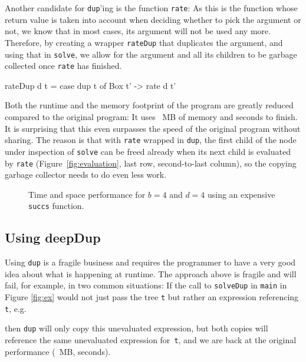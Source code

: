 \documentclass[preprint]{sigplanconf}
\theoremstyle{nonumberplain}
\newcommand{\li}{\lstinline[style=Haskell]}
\begin{document}
Another candidate for \li-dup-’ing is the function \li-rate-:
As this is the function whose return value is taken into account when deciding whether to pick the argument or not, we know that in most cases, its argument will not be used any more. Therefore, by creating a wrapper \li-rateDup- that duplicates the argument, and using that in \li-solve-, we allow for the argument and all its children to be garbage collected once \li-rate- has finished.
\begin{haskell}
rateDup d t = case dup t of Box t' -> rate d t'
\end{haskell}

Both the runtime and the memory footprint of the program are greatly reduced compared to the original program: It uses ~MB of memory and  seconds to finish. It is surprising that this even surpasses the speed of the original program without sharing. The reason is that with \li-rate- wrapped in \li-dup-, the first child of the node under inspection of \li-solve- can be freed already when its next child is evaluated by \li-rate- (Figure~\ref{fig:evaluation}, last row, second-to-last column), so the copying garbage collector needs to do even less work.

\begin{figure*}
\centering

\caption{Time and space performance for $b=4$ and $d=4$ using an expensive \li-succs- function.}
\label{fig:statsexpensive}
\end{figure*}


\subsection{Using deepDup}
\label{sec:deepdup}
Using \li-dup- is a fragile business and requires the programmer to have a very good idea about what is happening at runtime. The approach above is fragile and will fail, for example, in two common situations: If the call to \li-solveDup- in \li-main- in Figure \ref{fig:ex} would not just pass the tree \li-t- but rather an expression referencing \li-t-, e.g.
then \li-dup- will only copy this unevaluated expression, but both copies will reference the same unevaluated expression for~\li-t-, and we are back at the original performance (~MB,  seconds).
\end{document}
